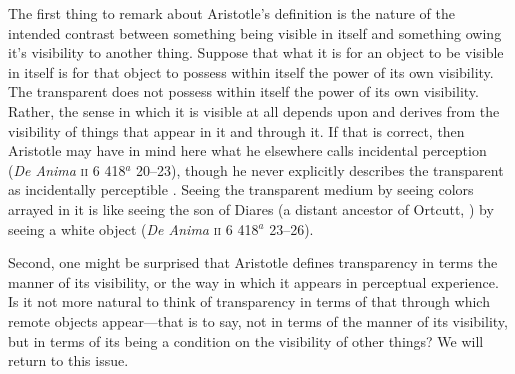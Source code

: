 The first thing to remark about Aristotle's definition is the nature of the intended contrast between something being visible in itself and something owing it's visibility to another thing. Suppose that what it is for an object to be visible in itself is for that object to possess within itself the power of its own visibility. The transparent does not possess within itself the power of its own visibility. Rather, the sense in which it is visible at all depends upon and derives from the visibility of things that appear in it and through it. If that is correct, then Aristotle may have in mind here what he elsewhere calls incidental perception (\emph{De Anima} \textsc{ii} 6 418\( ^{a} \) 20--23), though he never explicitly describes the transparent as incidentally perceptible \citep[260]{Polansky:2007ly}. Seeing the transparent medium by seeing colors arrayed in it is like seeing the son of Diares (a distant ancestor of Ortcutt, \citealt{Quine:1956qp}) by seeing a white object (\emph{De Anima} \textsc{ii} 6 418\( ^{a} \) 23--26).

Second, one might be surprised that Aristotle defines transparency in terms the manner of its visibility, or the way in which it appears in perceptual experience. Is it not more natural to think of transparency in terms of that through which remote objects appear---that is to say, not in terms of the manner of its visibility, but in terms of its being a condition on the visibility of other things? We will return to this issue.

